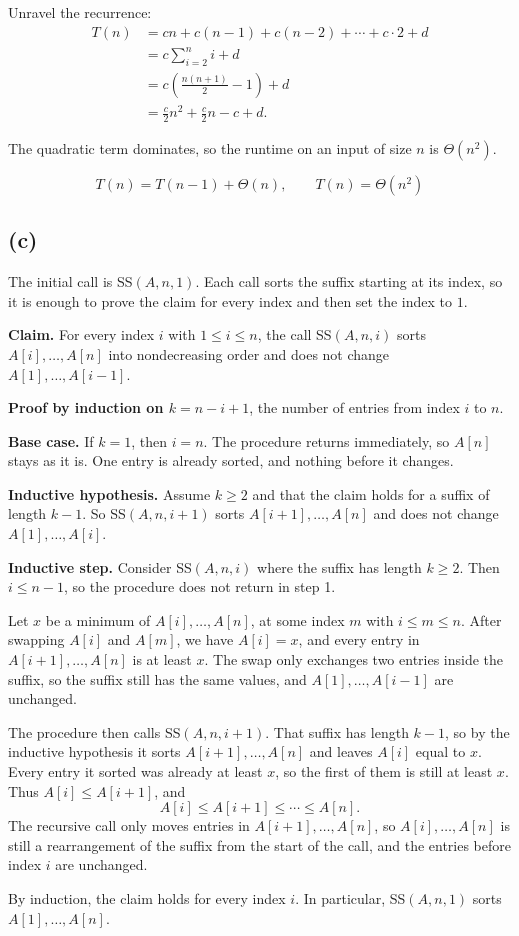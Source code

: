 \documentclass[11pt]{article}
\begin{document}
Unravel the recurrence:
\begin{align*}
T(n)
&= cn+c(n-1)+c(n-2)+\cdots+c\cdot 2+d\\
&= c\sum_{i=2}^{n}i+d\\
&= c\left(\frac{n(n+1)}{2}-1\right)+d\\
&= \frac{c}{2}n^{2}+\frac{c}{2}n-c+d.
\end{align*}

The quadratic term dominates, so the runtime on an input of size $n$ is $\Theta(n^{2})$.

\[
\boxed{T(n)=T(n-1)+\Theta(n),\qquad T(n)=\Theta(n^{2})}
\]

\subsection*{(c)}

The initial call is \textsc{SS}$(A,n,1)$. Each call sorts the suffix starting at its index, so it is enough to prove the claim for every index and then set the index to $1$.

\textbf{Claim.} For every index $i$ with $1\le i\le n$, the call \textsc{SS}$(A,n,i)$ sorts $A[i],\ldots,A[n]$ into nondecreasing order and does not change $A[1],\ldots,A[i-1]$.

\textbf{Proof by induction on $k=n-i+1$}, the number of entries from index $i$ to $n$.

\textbf{Base case.} If $k=1$, then $i=n$. The procedure returns immediately, so $A[n]$ stays as it is. One entry is already sorted, and nothing before it changes.

\textbf{Inductive hypothesis.} Assume $k\ge 2$ and that the claim holds for a suffix of length $k-1$. So \textsc{SS}$(A,n,i+1)$ sorts $A[i+1],\ldots,A[n]$ and does not change $A[1],\ldots,A[i]$.

\textbf{Inductive step.} Consider \textsc{SS}$(A,n,i)$ where the suffix has length $k\ge 2$. Then $i\le n-1$, so the procedure does not return in step 1.

Let $x$ be a minimum of $A[i],\ldots,A[n]$, at some index $m$ with $i\le m\le n$. After swapping $A[i]$ and $A[m]$, we have $A[i]=x$, and every entry in $A[i+1],\ldots,A[n]$ is at least $x$. The swap only exchanges two entries inside the suffix, so the suffix still has the same values, and $A[1],\ldots,A[i-1]$ are unchanged.

The procedure then calls \textsc{SS}$(A,n,i+1)$. That suffix has length $k-1$, so by the inductive hypothesis it sorts $A[i+1],\ldots,A[n]$ and leaves $A[i]$ equal to $x$. Every entry it sorted was already at least $x$, so the first of them is still at least $x$. Thus $A[i]\le A[i+1]$, and
\[
A[i]\le A[i+1]\le \cdots \le A[n].
\]
The recursive call only moves entries in $A[i+1],\ldots,A[n]$, so $A[i],\ldots,A[n]$ is still a rearrangement of the suffix from the start of the call, and the entries before index $i$ are unchanged.

By induction, the claim holds for every index $i$. In particular, \textsc{SS}$(A,n,1)$ sorts $A[1],\ldots,A[n]$.
\end{document}
